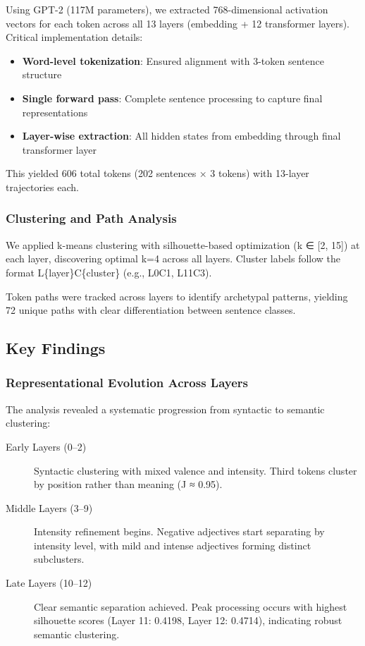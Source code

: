 Using GPT-2 (117M parameters), we extracted 768-dimensional activation vectors for each token across all 13 layers (embedding + 12 transformer layers). Critical implementation details:

\begin{itemize}
    \item \textbf{Word-level tokenization}: Ensured alignment with 3-token sentence structure
    \item \textbf{Single forward pass}: Complete sentence processing to capture final representations
    \item \textbf{Layer-wise extraction}: All hidden states from embedding through final transformer layer
\end{itemize}

This yielded 606 total tokens (202 sentences × 3 tokens) with 13-layer trajectories each.

\subsubsection{Clustering and Path Analysis}

We applied k-means clustering with silhouette-based optimization (k ∈ [2, 15]) at each layer, discovering optimal k=4 across all layers. Cluster labels follow the format L\{layer\}C\{cluster\} (e.g., L0C1, L11C3).

Token paths were tracked across layers to identify archetypal patterns, yielding 72 unique paths with clear differentiation between sentence classes.

\subsection{Key Findings}

\subsubsection{Representational Evolution Across Layers}

The analysis revealed a systematic progression from syntactic to semantic clustering:

\begin{description}
    \item[Early Layers (0--2)] Syntactic clustering with mixed valence and intensity. Third tokens cluster by position rather than meaning (J ≈ 0.95).
    
    \item[Middle Layers (3--9)] Intensity refinement begins. Negative adjectives start separating by intensity level, with mild and intense adjectives forming distinct subclusters.
    
    \item[Late Layers (10--12)] Clear semantic separation achieved. Peak processing occurs with highest silhouette scores (Layer 11: 0.4198, Layer 12: 0.4714), indicating robust semantic clustering.
\end{description}

